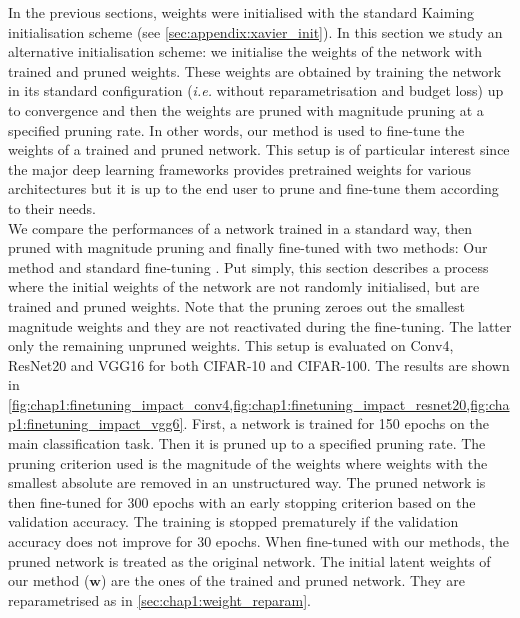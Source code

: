In the previous sections, weights were initialised with the standard Kaiming
initialisation scheme \cite{DBLP:conf/iccv/HeZRS15} (see
\cref{sec:appendix:xavier_init}). In this section we study an alternative
initialisation scheme: we initialise the weights of the network with trained
and pruned weights. These weights are obtained by training the network in its
standard configuration (\emph{i.e.} without reparametrisation and budget loss)
up to convergence and then the weights are pruned with magnitude pruning at a
specified pruning rate. In other words, our method is used to fine-tune the
weights of a trained and pruned network. This \DIFdelbegin {}\DIFdelend \DIFaddbegin {}\DIFaddend setup is of particular
interest since the major deep learning frameworks
\cite{DBLP:conf/nips/PaszkeGMLBCKLGA19,DBLP:journals/corr/AbadiABBCCCDDDG16}
provides pretrained weights for various architectures \cite{pytorch_vision} but
it is up to the end user to prune and fine-tune them according to their needs.\\

We compare the performances of a network trained in a standard way, then pruned
with magnitude pruning and finally fine-tuned with two methods: Our method and
standard fine-tuning \cite{DBLP:conf/nips/HanPTD15}. Put simply, this section
describes a process where the initial weights of the network are not randomly
initialised, but are trained and pruned weights. Note that the pruning
\DIFdelbegin {}\DIFdelend \DIFaddbegin {}\DIFaddend zeroes out the smallest magnitude weights and they are not
reactivated during the fine-tuning. The latter only \DIFdelbegin {}\DIFdelend \DIFaddbegin {}\DIFaddend the remaining unpruned
weights. This setup is evaluated on Conv4, ResNet20 and VGG16 for both CIFAR-10
and CIFAR-100. The results are shown in
\cref{fig:chap1:finetuning_impact_conv4,fig:chap1:finetuning_impact_resnet20,fig:chap1:finetuning_impact_vgg6}.
First, a network is trained for 150 epochs on the main classification task. Then
it is pruned up to a specified pruning rate. The pruning criterion used is the
magnitude of the weights where weights with the smallest absolute \DIFdelbegin {}\DIFdelend \DIFaddbegin {}\DIFaddend are
removed in an unstructured way. The pruned network is then fine-tuned for 300
epochs with an early stopping criterion based on the validation accuracy. The
training is stopped prematurely if the validation accuracy does not improve for
30 epochs. When fine-tuned with our methods, the pruned network is treated as
the original network. The initial latent weights of our method ($\mathbf{w}$)
are the ones of the trained and pruned network. They are reparametrised as in
\ref{sec:chap1:weight_reparam}.\\

